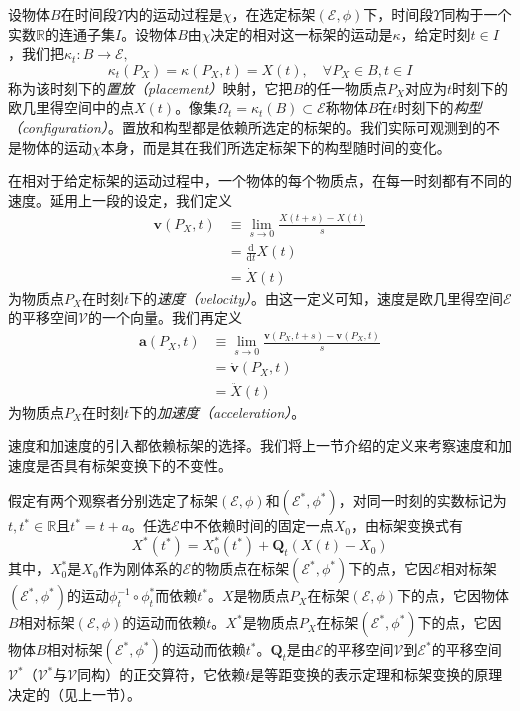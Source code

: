 \documentclass[main.tex]{subfiles}
\begin{document}
设物体$B$在时间段$\Upsilon$内的运动过程是$\chi$，在选定标架$\left(\mathcal{E},\phi\right)$下，时间段$\Upsilon$同构于一个实数$\mathbb{R}$的连通子集$I$。设物体$B$由$\chi$决定的相对这一标架的运动是$\kappa$，给定时刻$t\in I$，我们把$\kappa_t:B\rightarrow\mathcal{E},$
\[\kappa_t\left(P_X\right)=\kappa\left(P_X,t\right)=X\left(t\right),\quad\forall P_X\in B, t\in I\]
称为该时刻下的\emph{置放（placement）}映射，它把$B$的任一物质点$P_X$对应为$t$时刻下的欧几里得空间中的点$X\left(t\right)$。像集$\Omega_t=\kappa_t\left(B\right)\subset\mathcal{E}$称物体$B$在$t$时刻下的\emph{构型（configuration）}。置放和构型都是依赖所选定的标架的。我们实际可观测到的不是物体的运动$\chi$本身，而是其在我们所选定标架下的构型随时间的变化。

在相对于给定标架的运动过程中，一个物体的每个物质点，在每一时刻都有不同的速度。延用上一段的设定，我们定义
\begin{align*}
    \mathbf{v}\left(P_X,t\right) & \equiv\lim_{s\to 0}\frac{X\left(t+s\right)-X\left(t\right)}{s} \\
                                 & =\frac{\mathrm{d}}{\mathrm{d}t}X\left(t\right)                 \\
                                 & =\dot{X}\left(t\right)
\end{align*}
为物质点$P_X$在时刻$t$下的\emph{速度（velocity）}。由这一定义可知，速度是欧几里得空间$\mathcal{E}$的平移空间$\mathcal{V}$的一个向量。我们再定义
\begin{align*}
    \mathbf{a}\left(P_X,t\right) & \equiv\lim_{s\to 0}\frac{\mathbf{v}\left(P_X,t+s\right)-\mathbf{v}\left(P_X,t\right)}{s} \\
                                 & =\dot{\mathbf{v}}\left(P_X,t\right)                                                      \\
                                 & =\ddot{X}\left(t\right)
\end{align*}
为物质点$P_X$在时刻$t$下的\emph{加速度（acceleration）}。

速度和加速度的引入都依赖标架的选择。我们将上一节介绍的定义来考察速度和加速度是否具有标架变换下的不变性。

假定有两个观察者分别选定了标架$\left(\mathcal{E},\phi\right)$和$\left(\mathcal{E}^*,\phi^*\right)$，对同一时刻的实数标记为$t,t^*\in\mathbb{R}$且$t^*=t+a$。任选$\mathcal{E}$中不依赖时间的固定一点$X_0$，由标架变换式有
\[X^*\left(t^*\right)=X_0^*\left(t^*\right)+\mathbf{Q}_t\left(X\left(t\right)-X_0\right)\]
其中，$X_0^*$是$X_0$作为刚体系的$\mathcal{E}$的物质点在标架$\left(\mathcal{E}^*,\phi^*\right)$下的点，它因$\mathcal{E}$相对标架$\left(\mathcal{E}^*,\phi^*\right)$的运动$\phi_t^{-1}\circ\phi_t^*$而依赖$t^*$。$X$是物质点$P_X$在标架$\left(\mathcal{E},\phi\right)$下的点，它因物体$B$相对标架$\left(\mathcal{E},\phi\right)$的运动而依赖$t$。$X^*$是物质点$P_X$在标架$\left(\mathcal{E}^*,\phi^*\right)$下的点，它因物体$B$相对标架$\left(\mathcal{E}^*,\phi^*\right)$的运动而依赖$t^*$。$\mathbf{Q}_t$是由$\mathcal{E}$的平移空间$\mathcal{V}$到$\mathcal{E}^*$的平移空间$\mathcal{V}^*$（$\mathcal{V}^*$与$\mathcal{V}$同构）的正交算符，它依赖$t$是等距变换的表示定理和标架变换的原理决定的（见上一节）。
\end{document}
